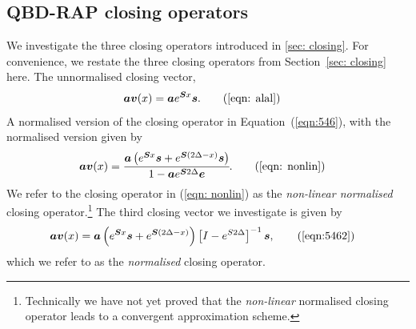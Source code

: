 
\subsection{QBD-RAP closing operators}\label{sec: closing vecs numerics}
We investigate the three closing operators introduced in \ref{sec: closing}. For convenience, we restate the three closing operators from Section~\ref{sec: closing} here. The unnormalised closing vector, 
\begin{align}
	\bs a {\bs v}(x) &= \bs a e^{\bs Sx}\bs s.\tag{\ref{eqn: alal}}
\end{align} 
A normalised version of the closing operator in Equation~(\ref{eqn:546}), with the normalised version given by 
\begin{align}
	\bs a {\bs v}(x) &= \cfrac{\bs a \left(e^{ \bs{S}x} \bs s + e^{ \bs{S}(2\Delta-x)} \bs s\right)}{1-\bs a e^{\bs S 2\Delta}\bs e}. \tag{\ref{eqn: nonlin}}
\end{align} 
We refer to the closing operator in (\ref{eqn: nonlin}) as the \emph{non-linear normalised} closing operator.\footnote{Technically we have not yet proved that the \emph{non-linear} normalised closing operator leads to a convergent approximation scheme.} The third closing vector we investigate is given by 
\begin{align}
	\bs a {\bs v}(x) &= \bs a \left(e^{ \bs{S}x} \bs s + e^{ \bs{S}(2\Delta-x)}\right)\left[I-e^{S2\Delta}\right]^{-1} \bs s,\tag{\ref{eqn:5462}}
\end{align}
which we refer to as the \emph{normalised} closing operator. 

